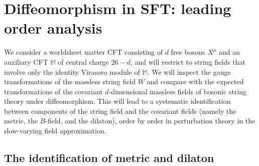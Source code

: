 \documentclass[12pt]{article}
\begin{document}
\section{Diffeomorphism in SFT: leading order analysis}
\label{sec:diffeopert}

We consider a worldsheet matter CFT consisting of $d$ free bosons $X^\mu$ and an auxiliary CFT $\mathbb{M}$ of central charge $26-d$, and will restrict to string fields that involve only the identity Virasoro module of $\mathbb{M}$. We will inspect the gauge transformations of the massless string field $W$ and compare with the expected transformations of the covariant $d$-dimensional massless fields of bosonic string theory under diffeomorphism. This will lead to a systematic identification between components of the string field and the covariant fields (namely the metric, the $B$-field, and the dilaton), order by order in perturbation theory in the slow-varying field approximation.

\subsection{The identification of metric and dilaton}
\label{sec:metricdil}
\end{document}
